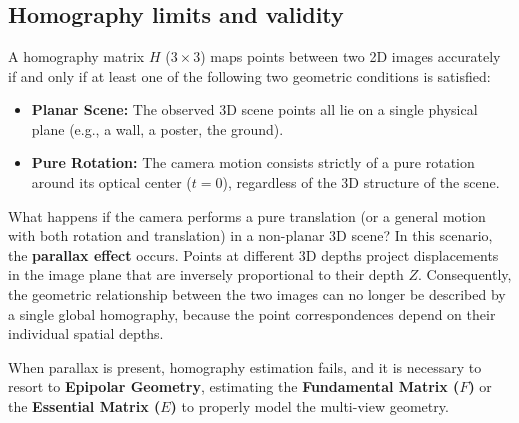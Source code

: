 
\section[Question -- {\it Homography limits and validity}]{}

\subsection{Homography limits and validity}
A homography matrix $H$ ($3 \times 3$) maps points between two 2D images accurately if and only if at least one of the following two geometric conditions is satisfied:
\begin{itemize}
    \item \textbf{Planar Scene:} The observed 3D scene points all lie on a single physical plane (e.g., a wall, a poster, the ground).
    \item \textbf{Pure Rotation:} The camera motion consists strictly of a pure rotation around its optical center ($t = 0$), regardless of the 3D structure of the scene.
\end{itemize}

What happens if the camera performs a pure translation (or a general motion with both rotation and translation) in a non-planar 3D scene? 
In this scenario, the \textbf{parallax effect} occurs. Points at different 3D depths project displacements in the image plane that are inversely proportional to their depth $Z$. Consequently, the geometric relationship between the two images can no longer be described by a single global homography, because the point correspondences depend on their individual spatial depths. 

When parallax is present, homography estimation fails, and it is necessary to resort to \textbf{Epipolar Geometry}, estimating the \textbf{Fundamental Matrix ($F$)} or the \textbf{Essential Matrix ($E$)} to properly model the multi-view geometry.